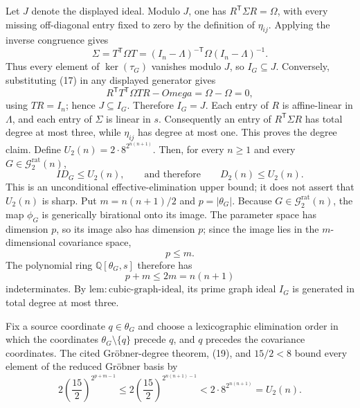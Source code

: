 Let \(J\) denote the displayed ideal.  Modulo \(J\), one has \(R^{\mathsf T}\Sigma R=\Omega\), with every missing off-diagonal entry fixed to zero by the definition of \(\eta_{ij}\).  Applying the inverse congruence gives
\[
 \Sigma=T^{\mathsf T}\Omega T=(I_n-\Lambda)^{-\mathsf T}\Omega(I_n-\Lambda)^{-1}. \tag{17}
\]
Thus every element of \(\ker(\tau_G)\) vanishes modulo \(J\), so \(I_G\subseteq J\).  Conversely, substituting (17) in any displayed generator gives
\[
 R^{\mathsf T}T^{\mathsf T}\Omega TR-Omega=\Omega-\Omega=0,
\]
using \(TR=I_n\); hence \(J\subseteq I_G\).  Therefore \(I_G=J\).  Each entry of \(R\) is affine-linear in \(\Lambda\), and each entry of \(\Sigma\) is linear in \(s\).  Consequently an entry of \(R^{\mathsf T}\Sigma R\) has total degree at most three, while \(\eta_{ij}\) has degree at most one.  This proves the degree claim.
Define \(U_2(n)=2\cdot8^{2^{n(n+1)}}\).  Then, for every \(n\geq1\) and every \(G\in\mathcal G_{2}^{\mathrm{rat}}(n)\),
\[
 ID_G\leq U_2(n),\qquad\text{and therefore}\qquad D_2(n)\leq U_2(n).
\]
This is an unconditional effective-elimination upper bound; it does not assert that \(U_2(n)\) is sharp.
Put \(m=n(n+1)/2\) and \(p=|\theta_G|\).  Because \(G\in\mathcal G_{2}^{\mathrm{rat}}(n)\), the map \(\phi_G\) is generically birational onto its image.  The parameter space has dimension \(p\), so its image also has dimension \(p\); since the image lies in the \(m\)-dimensional covariance space,
\[
 p\leq m. \tag{18}
\]
The polynomial ring \(\mathbb Q[\theta_G,s]\) therefore has
\[
 p+m\leq2m=n(n+1) \tag{19}
\]
indeterminates.  By \(\mathrm{lem:cubic\mbox{-}graph\mbox{-}ideal}\), its prime graph ideal \(I_G\) is generated in total degree at most three.

Fix a source coordinate \(q\in\theta_G\) and choose a lexicographic elimination order in which the coordinates \(\theta_G\setminus\{q\}\) precede \(q\), and \(q\) precedes the covariance coordinates.  The cited Gröbner-degree theorem, (19), and \(15/2<8\) bound every element of the reduced Gröbner basis by
\[
 2\left(\frac{15}{2}\right)^{2^{p+m-1}}
 \leq2\left(\frac{15}{2}\right)^{2^{n(n+1)-1}}
 <2\cdot8^{2^{n(n+1)}}=U_2(n). \tag{20}
\]

